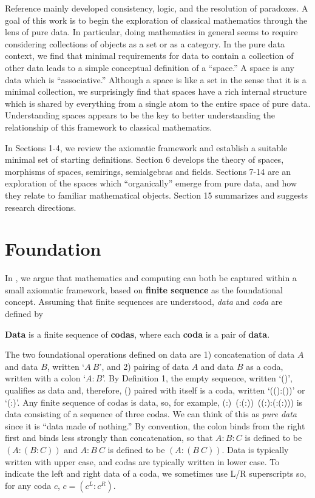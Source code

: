 \documentclass[11pt]{article}
\begin{document}
       Reference \cite{PDF} mainly developed  
consistency, logic, and the resolution of paradoxes.  A goal of this work is to begin the exploration of classical 
mathematics through the lens of pure data.  In particular, doing mathematics in general seems to require considering
collections of objects as a set or as a category.  In the pure data context, we find that minimal requirements for 
data to contain a collection of other data leads to a simple conceptual definition of a ``space.''  A space is any data 
which is ``associative.''  Although a space is like a set in the sense that it is a minimal collection, we surprisingly 
find that spaces have a rich internal structure which is shared by everything from a single atom to the entire 
space of pure data.  Understanding spaces appears to be the key 
to better understanding the relationship of this framework to classical mathematics.  

     In Sections 1-4, we review the axiomatic framework and establish a suitable minimal set of starting definitions.  
 Section 6 develops the theory of spaces, morphisms of spaces, semirings, semialgebras and fields.   Sections 7-14 
 are an exploration of the spaces which ``organically'' emerge from pure data, and how they relate to familiar mathematical objects.  
 Section 15 summarizes and suggests research directions. 

\section{Foundation}  

In \cite{PDF}, we argue that mathematics and computing can both be captured within a small axiomatic framework, 
based on {\bf finite sequence} as the foundational concept.  Assuming that finite sequences are understood, {\it data} and {\it coda} are defined by 

\begin{definition} {{\bf Data} is a finite sequence of {\bf codas}, where each {\bf coda} is a pair of {\bf data}.}
\end{definition}

\noindent The two foundational operations defined on data are 1) concatenation of data $A$ and data $B$, written `$A\ B$', and 2) pairing of data $A$ and data $B$ as a coda, written with a colon `$A:B$'.   
By Definition 1, the empty sequence, written `()', qualifies as data and, therefore, () paired with itself is a coda, written `(():())' or `(:)'.  
Any finite sequence of codas is data, so, for example, (:)\ (:(:))\ ((:):(:(:))) is  
data consisting of a sequence of three codas.  We can think of this as {\it pure data} since it is ``data made of nothing.''  
By convention, the colon binds from the right first and binds less strongly than concatenation, so that $A:B:C$ is defined to be $(A:(B:C))$ and $A:B\ C$ is defined to be $(A:(B\ C))$.  
Data is typically written with upper case, and codas are typically written in lower case.  
To indicate the left and right data of a coda, we sometimes use L/R superscripts so, for any coda $c$, $c=(c^L:c^R)$. 
\end{document}
